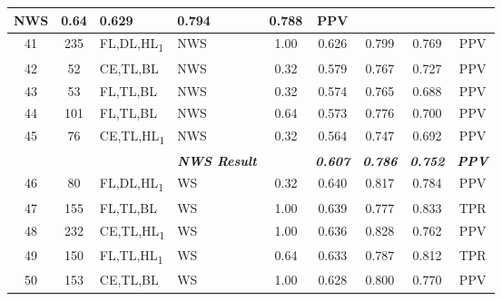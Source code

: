 \begin{table}[H]
{\begin{tabular}{ccl|l|c|c|c|c|c|}
    NWS &
    0.64 &
    0.629 &
    0.794 &
    0.788 &
    PPV \\ \hline
  \multicolumn{1}{|c|}{41} &
    \multicolumn{1}{c|}{235} &
    FL,DL,HL\textsubscript{1} &
    NWS &
    1.00 &
    0.626 &
    0.799 &
    0.769 &
    PPV \\ \hline
  \multicolumn{1}{|c|}{42} &
    \multicolumn{1}{c|}{52} &
    CE,TL,BL &
    NWS &
    0.32 &
    0.579 &
    0.767 &
    0.727 &
    PPV \\ \hline
  \multicolumn{1}{|c|}{43} &
    \multicolumn{1}{c|}{53} &
    FL,TL,BL &
    NWS &
    0.32 &
    0.574 &
    0.765 &
    0.688 &
    PPV \\ \hline
  \multicolumn{1}{|c|}{44} &
    \multicolumn{1}{c|}{101} &
    FL,TL,BL &
    NWS &
    0.64 &
    0.573 &
    0.776 &
    0.700 &
    PPV \\ \hline
  \multicolumn{1}{|c|}{45} &
    \multicolumn{1}{c|}{76} &
    CE,TL,HL\textsubscript{1} &
    NWS &
    0.32 &
    0.564 &
    0.747 &
    0.692 &
    PPV \\ \hline
   &
    \textit{\textbf{}} &
     &
    \textit{\textbf{NWS Result}} &
     &
    \textit{\textbf{0.607}} &
    \textit{\textbf{0.786}} &
    \textit{\textbf{0.752}} &
    \textit{\textbf{PPV}} \\ \hline
  \multicolumn{1}{|c|}{46} &
    \multicolumn{1}{c|}{80} &
    FL,DL,HL\textsubscript{1} &
    WS &
    0.32 &
    0.640 &
    0.817 &
    0.784 &
    PPV \\ \hline
  \multicolumn{1}{|c|}{47} &
    \multicolumn{1}{c|}{155} &
    FL,TL,BL &
    WS &
    1.00 &
    0.639 &
    0.777 &
    0.833 &
    TPR \\ \hline
  \multicolumn{1}{|c|}{48} &
    \multicolumn{1}{c|}{232} &
    CE,TL,HL\textsubscript{1} &
    WS &
    1.00 &
    0.636 &
    0.828 &
    0.762 &
    PPV \\ \hline
  \multicolumn{1}{|c|}{49} &
    \multicolumn{1}{c|}{150} &
    FL,TL,HL\textsubscript{1} &
    WS &
    0.64 &
    0.633 &
    0.787 &
    0.812 &
    TPR \\ \hline
  \multicolumn{1}{|c|}{50} &
    \multicolumn{1}{c|}{153} &
    CE,TL,BL &
    WS &
    1.00 &
    0.628 &
    0.800 &
    0.770 &
    PPV \\ \hline
  \end{tabular}%
  }
  \end{table}

